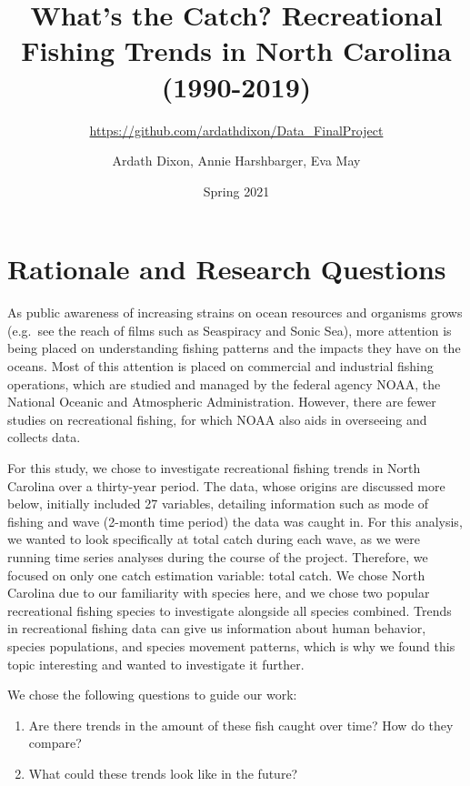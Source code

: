 \documentclass[
  12pt,
]{article}
\title{What's the Catch? Recreational Fishing Trends in North Carolina
(1990-2019)}
\subtitle{\url{https://github.com/ardathdixon/Data_FinalProject}}
\author{Ardath Dixon, Annie Harshbarger, Eva May}
\date{Spring 2021}
\begin{document}
\maketitle

\newpage
\tableofcontents 
\newpage
\listoftables 
\newpage
\listoffigures 
\newpage

\hypertarget{rationale-and-research-questions}{%
\section{Rationale and Research
Questions}\label{rationale-and-research-questions}}

As public awareness of increasing strains on ocean resources and
organisms grows (e.g.~see the reach of films such as Seaspiracy and
Sonic Sea), more attention is being placed on understanding fishing
patterns and the impacts they have on the oceans. Most of this attention
is placed on commercial and industrial fishing operations, which are
studied and managed by the federal agency NOAA, the National Oceanic and
Atmospheric Administration. However, there are fewer studies on
recreational fishing, for which NOAA also aids in overseeing and
collects data.

For this study, we chose to investigate recreational fishing trends in
North Carolina over a thirty-year period. The data, whose origins are
discussed more below, initially included 27 variables, detailing
information such as mode of fishing and wave (2-month time period) the
data was caught in. For this analysis, we wanted to look specifically at
total catch during each wave, as we were running time series analyses
during the course of the project. Therefore, we focused on only one
catch estimation variable: total catch. We chose North Carolina due to
our familiarity with species here, and we chose two popular recreational
fishing species to investigate alongside all species combined. Trends in
recreational fishing data can give us information about human behavior,
species populations, and species movement patterns, which is why we
found this topic interesting and wanted to investigate it further.

We chose the following questions to guide our work:

\begin{enumerate}
\def\labelenumi{\arabic{enumi}.}
\item
  Are there trends in the amount of these fish caught over time? How do
  they compare?
\item
  What could these trends look like in the future?
\end{enumerate}
\end{document}
